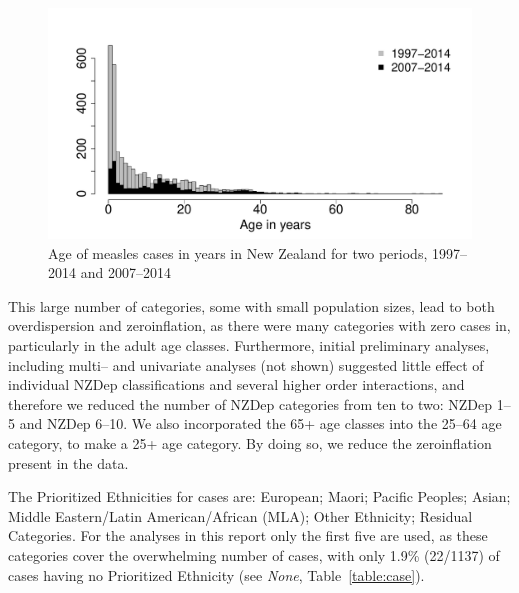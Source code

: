 \documentclass{article}
\begin{document}
\begin{figure}[h!]
\begin{center}
\includegraphics{interimreport2-002}
\end{center}
\caption{Age of measles cases in years in New Zealand for two periods, 1997--2014 and 2007--2014}
\label{fig:ageinyears}
\end{figure}





This large number of categories, some with small population sizes, lead to both overdispersion and zeroinflation, as there were many categories with zero cases in, particularly in the adult age classes. Furthermore, initial preliminary analyses, including multi-- and univariate analyses (not shown) suggested little effect of individual NZDep classifications and several higher order interactions, and therefore we reduced the number of NZDep categories from ten to two: NZDep 1--5 and NZDep 6--10. We also incorporated the 65+ age classes into the 25--64 age category, to make a 25+ age category. By doing so, we reduce the zeroinflation present in the data. 

The Prioritized Ethnicities for cases are:  European; Maori; Pacific Peoples; Asian; Middle Eastern/Latin American/African (MLA); Other Ethnicity; Residual Categories. For the analyses in this report only the first five are used, as these categories cover the overwhelming number of cases, with only 1.9\% (22/1137) of cases having no Prioritized Ethnicity (see \emph{None}, Table~\ref{table:case}). 
\end{document}
